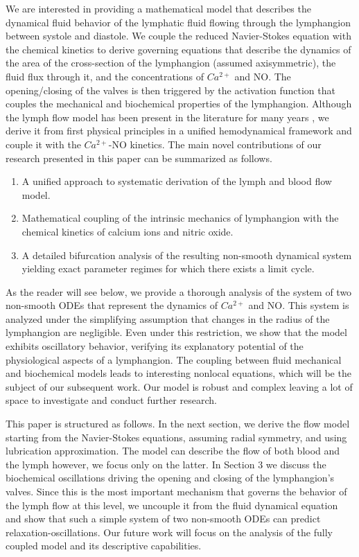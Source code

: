 \documentclass[12pt,a4paper]{article}
\begin{document}
We are interested in providing a mathematical model that describes the dynamical fluid behavior of the lymphatic fluid flowing through the lymphangion between systole and diastole. We couple the reduced Navier-Stokes equation with the chemical kinetics to derive governing equations that describe the dynamics of the area of the cross-section of the lymphangion (assumed axisymmetric), the fluid flux through it, and the concentrations of $Ca^{2+}$ and NO. The opening/closing of the valves is then triggered by the activation function that couples the mechanical and biochemical properties of the lymphangion. Although the lymph flow model has been present in the literature for many years \cite{reddy1995mathematical}, we derive it from first physical principles in a unified hemodynamical framework and couple it with the $Ca^{2+}$-NO kinetics. The main novel contributions of our research presented in this paper can be summarized as follows.
\begin{enumerate}
	\item A unified approach to systematic derivation of the lymph and blood flow model.
	\item Mathematical coupling of the intrinsic mechanics of lymphangion with the chemical kinetics of calcium ions and nitric oxide. 
	\item A detailed bifurcation analysis of the resulting non-smooth dynamical system yielding exact parameter regimes for which there exists a limit cycle.
\end{enumerate}
As the reader will see below, we provide a thorough analysis of the system of two non-smooth ODEs that represent the dynamics of $Ca^{2+}$ and NO. This system is analyzed under the simplifying assumption that changes in the radius of the lymphangion are negligible. Even under this restriction, we show that the model exhibits oscillatory behavior, verifying its explanatory potential of the physiological aspects of a lymphangion. The coupling between fluid mechanical and biochemical models leads to interesting nonlocal equations, which will be the subject of our subsequent work. Our model is robust and complex leaving a lot of space to investigate and conduct further research. 

This paper is structured as follows. In the next section, we derive the flow model starting from the Navier-Stokes equations, assuming radial symmetry, and using lubrication approximation. The model can describe the flow of both blood and the lymph however, we focus only on the latter. In Section 3 we discuss the biochemical oscillations driving the opening and closing of the lymphangion's valves. Since this is the most important mechanism that governs the behavior of the lymph flow at this level, we uncouple it from the fluid dynamical equation and show that such a simple system of two non-smooth ODEs can predict relaxation-oscillations. Our future work will focus on the analysis of the fully coupled model and its descriptive capabilities. 
\end{document}
